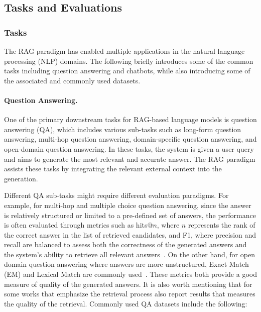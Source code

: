 \subsection{Tasks and Evaluations}
\subsubsection{Tasks}
\label{sec:eval}
The RAG paradigm has enabled multiple applications in the natural language processing (NLP) domains. The following briefly introduces some of the common tasks including question answering and chatbots, while also introducing some of the associated and commonly used datasets.

\paragraph{Question Answering.}  
One of the primary downstream tasks for RAG-based language models is question
answering (QA), which includes various sub-tasks such as long-form question
answering, multi-hop question answering, domain-specific question answering, and
open-domain question answering. In these tasks, the system is given a user query
and aims to generate the most relevant and accurate answer. The RAG paradigm assists these tasks by integrating the relevant external context into the generation.

Different QA sub-tasks might require different evaluation paradigms. For example, for multi-hop and multiple choice question answering, since the answer is relatively structured or limited to a pre-defined set of answers, the performance is often evaluated through metrics such as hits@$n$, where $n$ represents the rank of the correct answer in the list of retrieved candidates, and F1, where precision and recall are balanced to assess both the correctness of the generated answers and the system's ability to retrieve all relevant answers~\cite{luo2024rog, sun2023thinkongraph}. On the other hand, for open domain question answering where answers are more unstructured, Exact Match (EM) and Lexical Match are commonly used~\cite{zhang-etal-2023-survey-efficient}. These metrics both provide a good measure of quality of the generated answers. It is also worth mentioning that for some works that emphasize the retrieval process also report results that measures the quality of the retrieval. Commonly used QA datasets include the following:

